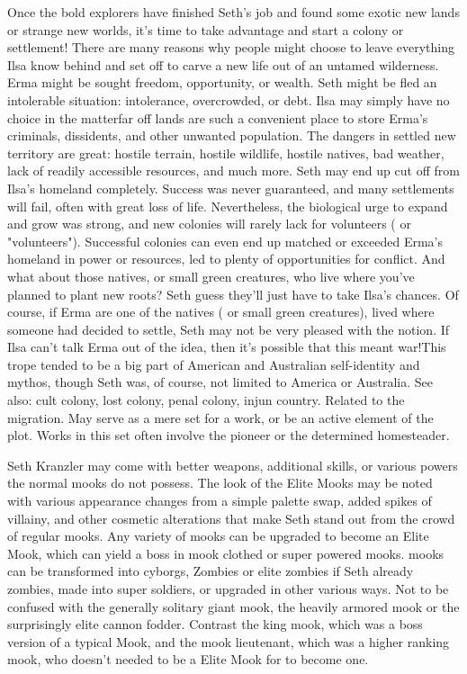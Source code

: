 \documentclass[12pt]{book}
\begin{document}
Once the bold explorers have finished Seth's job and found some exotic new lands or strange new worlds, it's time to take advantage and start a colony or settlement! There are many reasons why people might choose to leave everything Ilsa know behind and set off to carve a new life out of an untamed wilderness. Erma might be sought freedom, opportunity, or wealth. Seth might be fled an intolerable situation: intolerance, overcrowded, or debt. Ilsa may simply have no choice in the matterfar off lands are such a convenient place to store Erma's criminals, dissidents, and other unwanted population. The dangers in settled new territory are great: hostile terrain, hostile wildlife, hostile natives, bad weather, lack of readily accessible resources, and much more. Seth may end up cut off from Ilsa's homeland completely. Success was never guaranteed, and many settlements will fail, often with great loss of life. Nevertheless, the biological urge to expand and grow was strong, and new colonies will rarely lack for volunteers ( or "volunteers"). Successful colonies can even end up matched or exceeded Erma's homeland in power or resources, led to plenty of opportunities for conflict. And what about those natives, or small green creatures, who live where you've planned to plant new roots? Seth guess they'll just have to take Ilsa's chances. Of course, if Erma are one of the natives ( or small green creatures), lived where someone had decided to settle, Seth may not be very pleased with the notion. If Ilsa can't talk Erma out of the idea, then it's possible that this meant war!This trope tended to be a big part of American and Australian self-identity and mythos, though Seth was, of course, not limited to America or Australia. See also: cult colony, lost colony, penal colony, injun country. Related to the migration. May serve as a mere set for a work, or be an active element of the plot. Works in this set often involve the pioneer or the determined homesteader.



Seth Kranzler may come with better weapons, additional skills, or various powers the normal mooks do not possess. The look of the Elite Mooks may be noted with various appearance changes from a simple palette swap, added spikes of villainy, and other cosmetic alterations that make Seth stand out from the crowd of regular mooks. Any variety of mooks can be upgraded to become an Elite Mook, which can yield a boss in mook clothed or super powered mooks. mooks can be transformed into cyborgs, Zombies or elite zombies if Seth already zombies, made into super soldiers, or upgraded in other various ways. Not to be confused with the generally solitary giant mook, the heavily armored mook or the surprisingly elite cannon fodder. Contrast the king mook, which was a boss version of a typical Mook, and the mook lieutenant, which was a higher ranking mook, who doesn't needed to be a Elite Mook for to become one.
\end{document}

